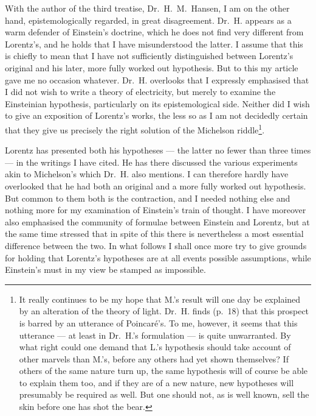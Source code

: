 \documentclass[12pt,a4paper]{article}
\begin{document}
With the author of the third treatise, Dr.\ H.\ M.\ Hansen, I am on the other
hand, epistemologically regarded, in great disagreement. Dr.\ H. appears as a
warm defender of Einstein's doctrine, which he does not find very different
from Lorentz's, and he holds that I have misunderstood the latter. I assume
that this is chiefly to mean that I have not sufficiently distinguished
between Lorentz's original and his later, more fully worked out hypothesis.
But to this my article gave me no occasion whatever. Dr.\ H. overlooks that I
expressly emphasised that I did not wish to write a theory of electricity, but
merely to examine the Einsteinian hypothesis, particularly on its
epistemological side. Neither did I wish to give an exposition of Lorentz's
works, the less so as I am not decidedly certain that they give us precisely
the right solution of the Michelson riddle\footnote{It really continues to be
my hope that M.'s result will one day be explained by an alteration of the
theory of light. Dr.\ H. finds (p.\ 18) that this prospect is barred by an
utterance of Poincaré's. To me, however, it seems that this utterance --- at
least in Dr.\ H.'s formulation --- is quite unwarranted. By what right could
one demand that L.'s hypothesis should take account of other marvels than
M.'s, before any others had yet shown themselves? If others of the same nature
turn up, the same hypothesis will of course be able to explain them too, and
if they are of a new nature, new hypotheses will presumably be required as
well. But one should not, as is well known, sell the skin before one has shot
the bear.}.

Lorentz has presented both his hypotheses --- the latter no fewer than three
times --- in the writings I have cited. He has there discussed the various
experiments akin to Michelson's which Dr.\ H. also mentions. I can therefore
hardly have overlooked that he had both an original and a more fully worked
out hypothesis. But common to them both is the contraction, and I needed
nothing else and nothing more for my examination of Einstein's train of
thought. I have moreover also emphasised the community of formulae between
Einstein and Lorentz, but at the same time stressed that in spite of this
there is nevertheless a most essential difference between the two. In what
follows I shall once more try to give grounds for holding that Lorentz's
hypotheses are at all events possible assumptions, while Einstein's must in my
view be stamped as impossible.
\end{document}
